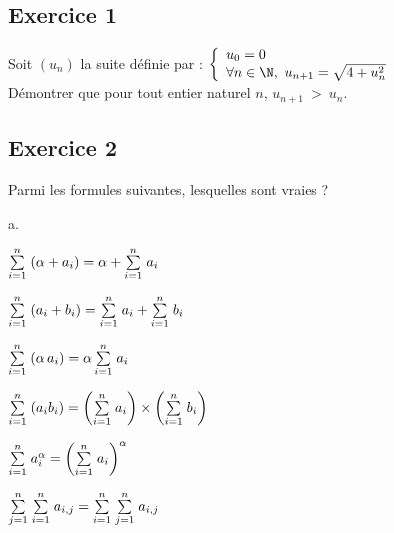 \documentclass[11pt]{article}%
\begin{document}
\subsection*{Exercice 1}
\noindent
  Soit $(u_n)$ la suite définie par : %
  $%
  \left\{
    \begin{array}{l}
      u_0 = 0 \\
      \forall n \in \N, \ u_{n+1} = \sqrt{4 + u_n^2}
    \end{array}
  \right.
  $\\
  Démontrer que pour tout entier naturel $n$, $u_{n+1} \ > \ u_n$.


\subsection*{Exercice 2}
\noindent
Parmi les formules suivantes, lesquelles sont vraies ?\\[-.8cm]
  \begin{noliste}{a.}
    \begin{minipage}[t]{.45\linewidth}
    \item ${\textstyle\sum\limits_{i=1}^{n}}\hspace{.1cm} (\alpha+a_i) = \alpha + {\textstyle\sum\limits_{i=1}^{n}}\hspace{.1cm} a_i$
    \item ${\textstyle\sum\limits_{i=1}^{n}}\hspace{.1cm} (a_i + b_i) = {\textstyle\sum\limits_{i=1}^{n}}\hspace{.1cm} a_i + {\textstyle\sum\limits_{i=1}^{n}}\hspace{.1cm}
      b_i$
    \item ${\textstyle\sum\limits_{i=1}^{n}}\hspace{.1cm} (\alpha \, a_i) = \alpha \, {\textstyle\sum\limits_{i=1}^{n}}\hspace{.1cm} a_i$
    \end{minipage}
    \begin{minipage}[t]{.45\linewidth}
    \item ${\textstyle\sum\limits_{i=1}^{n}}\hspace{.1cm} (a_i b_i) = \left({\textstyle\sum\limits_{i=1}^{n}}\hspace{.1cm} a_i\right)
      \times \left({\textstyle\sum\limits_{i=1}^{n}}\hspace{.1cm} b_i\right)$
    \item ${\textstyle\sum\limits_{i=1}^{n}}\hspace{.1cm} a_i^\alpha = \left({\textstyle\sum\limits_{i=1}^{n}}\hspace{.1cm} a_i
      \right)^\alpha$
    \item ${\textstyle\sum\limits_{j=1}^{n}}\hspace{.1cm} {\textstyle\sum\limits_{i=1}^{n}}\hspace{.1cm} a_{i,j} = {\textstyle\sum\limits_{i=1}^{n}}\hspace{.1cm}
      {\textstyle\sum\limits_{j=1}^{n}}\hspace{.1cm} a_{i,j}$
    \end{minipage}
  \end{noliste}
\end{document}
